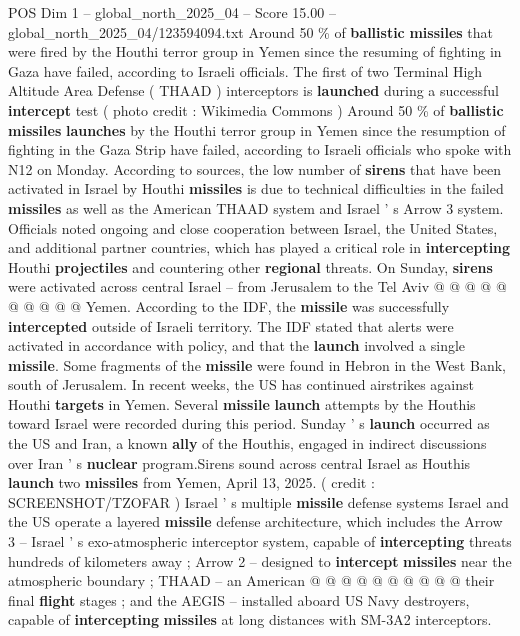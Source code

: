 \begin{textsample}{POS Dim 1 – global\_north\_2025\_04 – Score 15.00 – global\_north\_2025\_04/123594094.txt}  \label{ex:f1_pos_414}
Around 50 \% of \textbf{ballistic} \textbf{missiles} that were fired by the Houthi terror group in Yemen since the resuming of fighting in Gaza have failed, according to Israeli officials.
The first of two Terminal High Altitude Area Defense ( THAAD ) interceptors is \textbf{launched} during a successful \textbf{intercept} test ( photo credit : Wikimedia Commons ) Around 50 \% of \textbf{ballistic} \textbf{missiles} \textbf{launches} by the Houthi terror group in Yemen since the resumption of fighting in the Gaza Strip have failed, according to Israeli officials who spoke with N12 on Monday.
According to sources, the low number of \textbf{sirens} that have been activated in Israel by Houthi \textbf{missiles} is due to technical difficulties in the failed \textbf{missiles} as well as the American THAAD system and Israel ' s Arrow 3 system.
Officials noted ongoing and close cooperation between Israel, the United States, and additional partner countries, which has played a critical role in \textbf{intercepting} Houthi \textbf{projectiles} and countering other \textbf{regional} threats.
On Sunday, \textbf{sirens} were activated across central Israel -- from Jerusalem to the Tel Aviv @ @ @ @ @ @ @ @ @ @ Yemen.
According to the IDF, the \textbf{missile} was successfully \textbf{intercepted} outside of Israeli territory.
The IDF stated that alerts were activated in accordance with policy, and that the \textbf{launch} involved a single \textbf{missile}.
Some fragments of the \textbf{missile} were found in Hebron in the West Bank, south of Jerusalem.
In recent weeks, the US has continued airstrikes against Houthi \textbf{targets} in Yemen.
Several \textbf{missile} \textbf{launch} attempts by the Houthis toward Israel were recorded during this period.
Sunday ' s \textbf{launch} occurred as the US and Iran, a known \textbf{ally} of the Houthis, engaged in indirect discussions over Iran ' s \textbf{nuclear} program.Sirens sound across central Israel as Houthis \textbf{launch} two \textbf{missiles} from Yemen, April 13, 2025. ( credit : SCREENSHOT/TZOFAR ) Israel ' s multiple \textbf{missile} defense systems Israel and the US operate a layered \textbf{missile} defense architecture, which includes the Arrow 3 -- Israel ' s exo-atmospheric interceptor system, capable of \textbf{intercepting} threats hundreds of kilometers away ; Arrow 2 -- designed to \textbf{intercept} \textbf{missiles} near the atmospheric boundary ; THAAD -- an American @ @ @ @ @ @ @ @ @ @ their final \textbf{flight} stages ; and the AEGIS -- installed aboard US Navy destroyers, capable of \textbf{intercepting} \textbf{missiles} at long distances with SM-3A2 interceptors.

\end{textsample}
